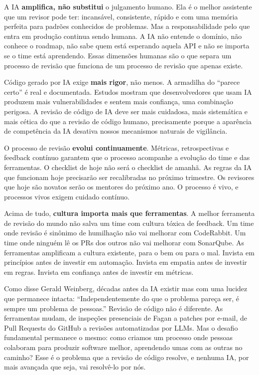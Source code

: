 A IA \textbf{amplifica, não substitui} o julgamento humano. Ela é o melhor assistente
que um revisor pode ter: incansável, consistente, rápido e com uma memória perfeita
para padrões conhecidos de problemas. Mas a responsabilidade pelo que entra em
produção continua sendo humana. A IA não entende o domínio, não conhece o roadmap,
não sabe quem está esperando aquela API e não se importa se o time está aprendendo.
Essas dimensões humanas são o que separa um processo de revisão que funciona de um
processo de revisão que apenas existe.

Código gerado por IA exige \textbf{mais rigor}, não menos. A armadilha do ``parece
certo'' é real e documentada. Estudos mostram que desenvolvedores que usam IA
produzem mais vulnerabilidades e sentem mais confiança, uma combinação perigosa.
A revisão de código de IA deve ser mais cuidadosa, mais sistemática e mais cética do
que a revisão de código humano, precisamente porque a aparência de competência da IA
desativa nossos mecanismos naturais de vigilância.

O processo de revisão \textbf{evolui continuamente}. Métricas, retrospectivas e
feedback contínuo garantem que o processo acompanhe a evolução do time e das
ferramentas. O checklist de hoje não será o checklist de amanhã. As regras da IA que
funcionam hoje precisarão ser recalibradas no próximo trimestre. Os revisores que hoje
são novatos serão os mentores do próximo ano. O processo é vivo, e processos vivos
exigem cuidado contínuo.

Acima de tudo, \textbf{cultura importa mais que ferramentas}. A melhor ferramenta
de revisão do mundo não salva um time com cultura tóxica de feedback. Um time onde
revisão é sinônimo de humilhação não vai melhorar com CodeRabbit. Um time onde
ninguém lê os PRs dos outros não vai melhorar com SonarQube. As ferramentas
amplificam a cultura existente, para o bem ou para o mal. Invista em princípios
antes de investir em automação. Invista em empatia antes de investir em regras.
Invista em confiança antes de investir em métricas.

Como disse Gerald Weinberg, décadas antes da IA existir mas com uma lucidez que
permanece intacta: ``Independentemente do que o problema pareça ser, é sempre um
problema de pessoas.'' Revisão de código não é diferente. As ferramentas mudam,
de inspeções presenciais de Fagan a patches por e-mail, de Pull Requests do GitHub
a revisões automatizadas por LLMs. Mas o desafio fundamental permanece o mesmo: como
criamos um processo onde pessoas colaboram para produzir software melhor, aprendendo
umas com as outras no caminho? Esse é o problema que a revisão de código
resolve, e nenhuma IA, por mais avançada que seja, vai resolvê-lo por nós.

